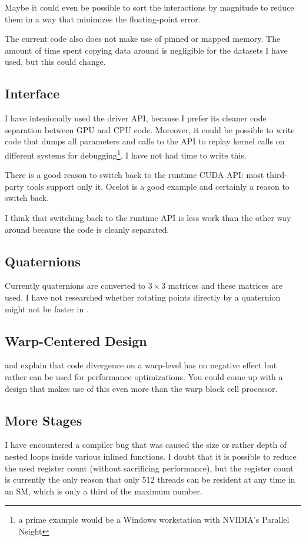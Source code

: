 Maybe it could even be possible to sort the interactions by magnitude to reduce them in a way that minimizes the floating-point error.

The current code also does not make use of pinned or mapped memory. The amount of time spent copying data around is negligible for the datasets I have used, but this could change.

\subsection{\cuda{} Interface}
I have intenionally used the driver API, because I prefer its cleaner code separation between GPU and CPU code. Moreover, it could be possible to write code that dumps all parameters and calls to the API to replay kernel calls on different systems for debugging\footnote{a prime example would be a Windows workstation with NVIDIA's Parallel Nsight}. I have not had time to write this.

There is a good reason to switch back to the runtime CUDA API: most third-party tools support only it. Ocelot is a good example and certainly a reason to switch back. 

I think that switching back to the runtime API is less work than the other way around because the code is cleanly separated.

\subsection{Quaternions}
Currently quaternions are converted to $3 \times 3$ matrices and these matrices are used. I have not researched whether rotating points directly by a quaternion might not be faster in \cuda{}.

\subsection{Warp-Centered Design}
 and  explain that code divergence on a warp-level has no negative effect but rather can be used for performance optimizations.
You could come up with a design that makes use of this even more than the warp block cell processor.

\subsection{More Stages}
I have encountered a compiler bug that was caused the size or rather depth of nested loops inside various inlined functions. I doubt that it is possible to reduce the used register count (without sacrificing performance), but the register count is currently the only reason that only 512 threads can be resident at any time in an SM, which is only a third of the maximum number.

